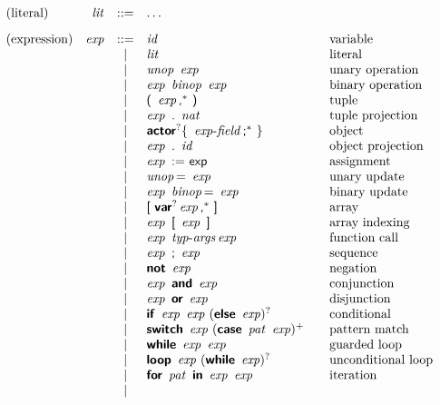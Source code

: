\begin{figure*}

$$
\begin{array}{@{}lrcl@{\qquad}l}
\text{(literal)} & \x{lit} &::=&
  \dots \\
[2ex]
\text{(expression)} & \x{exp} &::=&
  \x{id}
    & \text{variable} \\&&|&
  \x{lit}
    & \text{literal} \\&&|&
  \x{unop}~\x{exp}
    & \text{unary operation} \\&&|&
  \x{exp}~\x{binop}~\x{exp}
    & \text{binary operation} \\&&|&
  \K(~\x{exp}\K,^\ast~\K)
    & \text{tuple} \\&&|&
  \x{exp}~\K.~\x{nat}
    & \text{tuple projection} \\&&|&
  \KK{actor}^? \K\{~\x{exp-field}\K;^\ast~\K\}
    & \text{object} \\&&|&
  \x{exp}~\K.~\x{id}
    & \text{object projection} \\&&|&
  \x{exp}~\K{:=}~\K{exp}
    & \text{assignment} \\&&|&
  \x{unop}\K{=}~\x{exp}
    & \text{unary update} \\&&|&
  \x{exp}~\x{binop}\K{=}~\x{exp}
    & \text{binary update} \\&&|&
  \K[~\KK{var}^? \x{exp}\K,^\ast~\K]
    & \text{array} \\&&|&
  \x{exp}~\K[~\x{exp}~\K]
    & \text{array indexing} \\&&|&
  \x{exp}~\x{typ-args} \x{exp}
    & \text{function call} \\&&|&
  \x{exp}~\K;~\x{exp}
    & \text{sequence} \\&&|&
  \KK{not}~\x{exp}
    & \text{negation} \\&&|&
  \x{exp}~\KK{and}~\x{exp}
    & \text{conjunction} \\&&|&
  \x{exp}~\KK{or}~\x{exp}
    & \text{disjunction} \\&&|&
  \KK{if}~\x{exp}~\x{exp}~(\KK{else}~\x{exp})^?
    & \text{conditional} \\&&|&
  \KK{switch}~\x{exp}~(\KK{case}~\x{pat}~\x{exp})^+
    & \text{pattern match} \\&&|&
  \KK{while}~\x{exp}~\x{exp}
    & \text{guarded loop} \\&&|&
  \KK{loop}~\x{exp}~(\KK{while}~\x{exp})^?
    & \text{unconditional loop} \\&&|&
  \KK{for}~\x{pat}~\KK{in}~\x{exp}~\x{exp}
    & \text{iteration} \\&&|&

\end{array}$$
\end{figure*}
